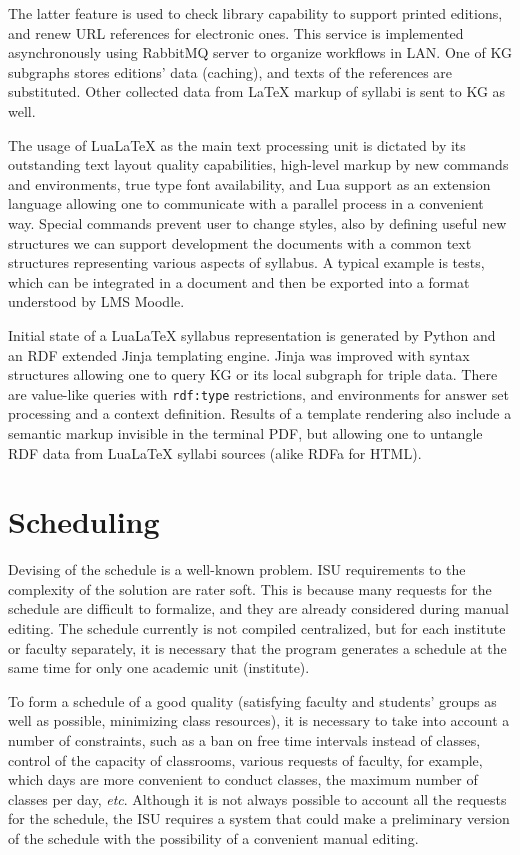 \documentclass[
]{aiitart}
\providecommand{\LuaLaTeX}{Lua\LaTeX}
\begin{document}
The latter feature is used to check library capability to support printed editions, and renew URL references for electronic ones.  This service is implemented asynchronously using RabbitMQ server to organize workflows in LAN.  One of KG subgraphs stores editions' data (caching), and texts of the references are substituted.  Other collected data from \LaTeX{} markup of syllabi is sent to KG as well.

The usage of \LuaLaTeX{} as the main text processing unit is dictated by its outstanding text layout quality capabilities, high-level markup by new commands and environments, true type font availability, and Lua support as an extension language allowing one to communicate with a parallel process in a convenient way.  Special commands prevent user to change styles, also by defining useful new structures we can support development the documents with a common text structures representing various aspects of syllabus.  A typical example is tests, which can be integrated in a document and then be exported into a format understood by LMS Moodle.

Initial state of a \LuaLaTeX{} syllabus representation is generated by Python and an RDF extended Jinja templating engine.  Jinja was improved with syntax structures allowing one to query KG or its local subgraph for triple data.  There are value-like queries with \verb|rdf:type| restrictions, and environments for answer set processing and a context definition.  Results of a template rendering also include a semantic markup invisible in the terminal PDF, but allowing one to untangle RDF data from \LuaLaTeX{} syllabi sources (alike RDFa for HTML).

\section{Scheduling}

Devising of the schedule is a well-known problem.  ISU requirements to the complexity of the solution are rater soft. This is because many requests for the schedule are difficult to formalize, and they are already considered during manual editing. The schedule currently is not compiled centralized, but for each institute or faculty separately, it is necessary that the program generates a schedule at the same time for only one academic unit (institute).

To form a schedule of a good quality (satisfying faculty and students' groups as well as possible, minimizing class resources), it is necessary to take into account a number of constraints, such as a ban on free time intervals instead of classes, control of the capacity of classrooms, various requests of faculty, for example, which days are more convenient to conduct classes, the maximum number of classes per day, \emph{etc}.  Although it is not always possible to account all the requests for the schedule, the ISU requires a system that could make a preliminary version of the schedule with the possibility of a convenient manual editing.
\end{document}
